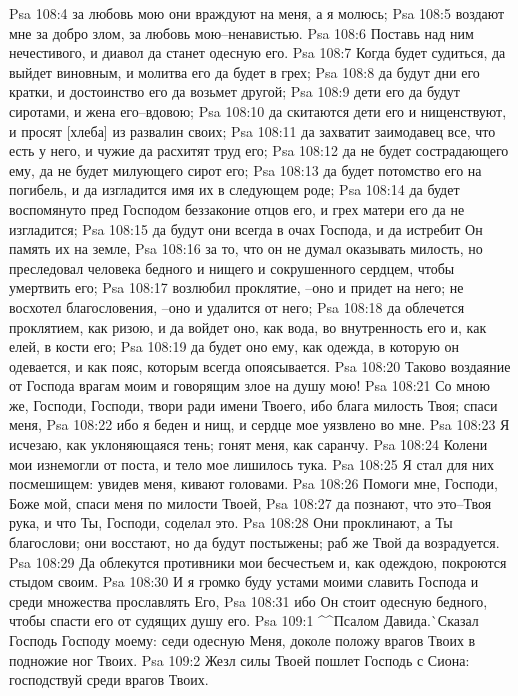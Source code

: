 Psa 108:4  за любовь мою они враждуют на меня, а я молюсь;
Psa 108:5  воздают мне за добро злом, за любовь мою--ненавистью.
Psa 108:6  Поставь над ним нечестивого, и диавол да станет одесную его.
Psa 108:7  Когда будет судиться, да выйдет виновным, и молитва его да будет в грех;
Psa 108:8  да будут дни его кратки, и достоинство его да возьмет другой;
Psa 108:9  дети его да будут сиротами, и жена его--вдовою;
Psa 108:10  да скитаются дети его и нищенствуют, и просят [хлеба] из развалин своих;
Psa 108:11  да захватит заимодавец все, что есть у него, и чужие да расхитят труд его;
Psa 108:12  да не будет сострадающего ему, да не будет милующего сирот его;
Psa 108:13  да будет потомство его на погибель, и да изгладится имя их в следующем роде;
Psa 108:14  да будет воспомянуто пред Господом беззаконие отцов его, и грех матери его да не изгладится;
Psa 108:15  да будут они всегда в очах Господа, и да истребит Он память их на земле,
Psa 108:16  за то, что он не думал оказывать милость, но преследовал человека бедного и нищего и сокрушенного сердцем, чтобы умертвить его;
Psa 108:17  возлюбил проклятие, --оно и придет на него; не восхотел благословения, --оно и удалится от него;
Psa 108:18  да облечется проклятием, как ризою, и да войдет оно, как вода, во внутренность его и, как елей, в кости его;
Psa 108:19  да будет оно ему, как одежда, в которую он одевается, и как пояс, которым всегда опоясывается.
Psa 108:20  Таково воздаяние от Господа врагам моим и говорящим злое на душу мою!
Psa 108:21  Со мною же, Господи, Господи, твори ради имени Твоего, ибо блага милость Твоя; спаси меня,
Psa 108:22  ибо я беден и нищ, и сердце мое уязвлено во мне.
Psa 108:23  Я исчезаю, как уклоняющаяся тень; гонят меня, как саранчу.
Psa 108:24  Колени мои изнемогли от поста, и тело мое лишилось тука.
Psa 108:25  Я стал для них посмешищем: увидев меня, кивают головами.
Psa 108:26  Помоги мне, Господи, Боже мой, спаси меня по милости Твоей,
Psa 108:27  да познают, что это--Твоя рука, и что Ты, Господи, соделал это.
Psa 108:28  Они проклинают, а Ты благослови; они восстают, но да будут постыжены; раб же Твой да возрадуется.
Psa 108:29  Да облекутся противники мои бесчестьем и, как одеждою, покроются стыдом своим.
Psa 108:30  И я громко буду устами моими славить Господа и среди множества прославлять Его,
Psa 108:31  ибо Он стоит одесную бедного, чтобы спасти его от судящих душу его.
Psa 109:1  ^^Псалом Давида.^^ Сказал Господь Господу моему: седи одесную Меня, доколе положу врагов Твоих в подножие ног Твоих.
Psa 109:2  Жезл силы Твоей пошлет Господь с Сиона: господствуй среди врагов Твоих.
